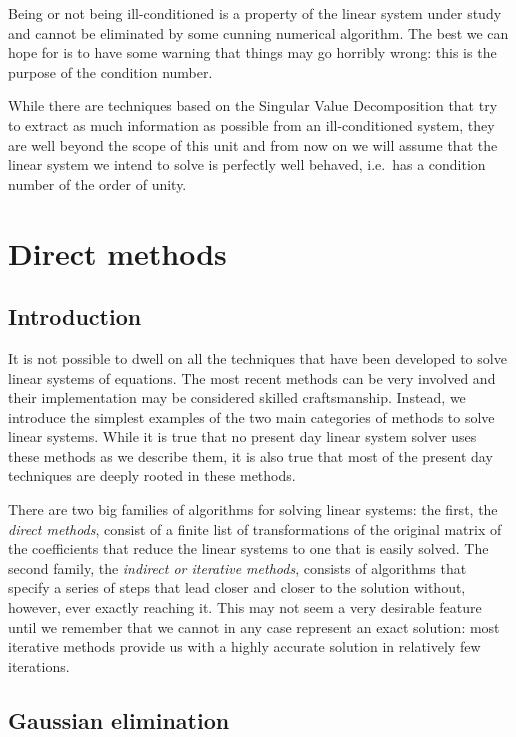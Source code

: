 Being or not being ill-conditioned is a property of the linear system
under study and cannot be eliminated by some cunning numerical
algorithm. The best we can hope for is to have some warning that
things may go horribly wrong: this is the purpose of the condition
number.

While there are techniques based on the Singular Value Decomposition
that try to extract as much information as possible from an
ill-conditioned system, they are well beyond the scope of this unit
and from now on we will assume that the linear system we intend to
solve is perfectly well behaved, i.e.\ has a condition number of the
order of unity.

\section{Direct methods}

\subsection{Introduction}

It is not  possible to  dwell  on all  the  techniques that have  been
developed to  solve  linear  systems of  equations.    The most recent
methods    can be  very  involved    and their  implementation may  be
considered skilled craftsmanship.  Instead,  we introduce the simplest
examples  of  the two  main  categories  of  methods to  solve  linear
systems.  While it is  true that no present  day linear system  solver
uses these methods as we describe them, it is also true that most
of the present day techniques are deeply rooted in these methods.

There are two big families of algorithms for solving linear systems:
the first, the \textit{direct methods}, consist of a finite list of
transformations of the original matrix of the coefficients that reduce
the linear systems to one that is easily solved.  The second family,
the \textit{indirect or iterative methods}, consists of algorithms
that specify a series of steps that lead closer and closer to the
solution without, however, ever exactly reaching it.  This may not
seem a very desirable feature until we remember that we cannot in any
case represent an exact solution: most iterative methods provide us
with a highly accurate solution in relatively few iterations.

\subsection{Gaussian elimination}

